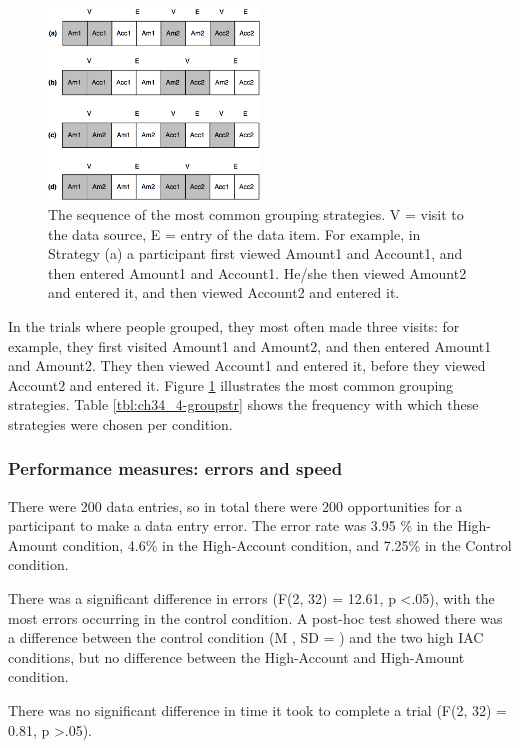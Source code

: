 \begin{table}
\begin{enumerate}
\begin{figure}[!ht]
  \centering
    \includegraphics[width=0.5\textwidth]{images/Study4/ch34_4-groupstr.png}
      \caption{The sequence of the most common grouping strategies. V = visit to the data source, E = entry of the data item. For example, in Strategy (a) a participant first viewed Amount1 and Account1, and then entered Amount1 and Account1. He/she then viewed Amount2 and entered it, and then viewed Account2 and entered it.}
          \label{fig:ch34_4-groupstr}
\end{figure}


In the trials where people grouped, they most often made three visits: for example, they first visited Amount1 and Amount2, and then entered Amount1 and Amount2. They then viewed Account1 and entered it, before they viewed Account2 and entered it. Figure \ref{fig:ch34_4-groupstr} illustrates the most common grouping strategies. Table \ref{tbl:ch34_4-groupstr} shows the frequency with which these strategies were chosen per condition. 



\subsubsection{Performance measures: errors and speed}
There were 200 data entries, so in total there were 200 opportunities for a participant to make a data entry error. The error rate was 3.95 \% in the High-Amount condition, 4.6\% in the High-Account condition, and 7.25\% in the Control condition. 

There was a significant difference in errors  (F(2, 32) = 12.61, p <.05), with the most errors occurring in the control condition. A post-hoc test showed there was a difference between the control condition (M , SD = ) and the two high IAC conditions, but no difference between the High-Account and High-Amount condition. 

There was no significant difference in time it took to complete a trial (F(2, 32) = 0.81, p >.05).


\end{enumerate}
\end{table}
